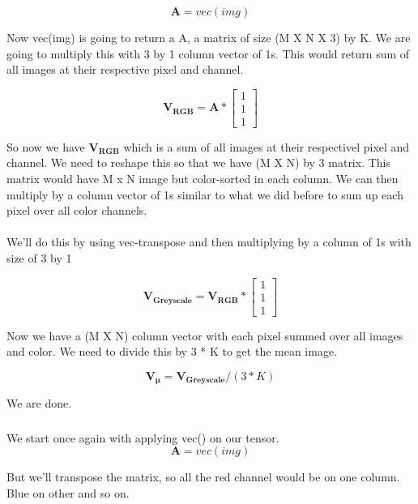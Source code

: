 \documentclass{article}
\newcommand{\matr}[1]{\mathbf{#1}}
\begin{document}
		\begin{equation*}
		\matr{A} = vec(img)
		\end{equation*}

		Now vec(img) is going to return a A, a matrix of size (M X N X 3) by K. We are going to multiply this with 3 by 1 column vector of 1s. 
		This would return sum of all images at their respective pixel and channel.

		\begin{equation*}
		\matr{V_{RGB}} = \matr{A} * 
						\begin{bmatrix} 
						1 \\ 1 \\ 1  
						\end{bmatrix} 
		\end{equation*}	
		
		So now we have $\matr{V_{RGB}}$ which is a sum of all images at their respectivel pixel and channel. We need to reshape this so that
		we have (M X N) by 3 matrix. This matrix would have M x N image but color-sorted in each column.  
		We can then multiply by a column vector of 1s similar to what we did before to sum up each pixel over all color channels. \\
		\\
		We'll do this by using vec-transpose and then multiplying by a column of 1s with size of 3 by 1

		\begin{equation*}
		\matr{V_{Greyscale}} = \matr{V_{RGB}} * 
						\begin{bmatrix} 
						1 \\ 1 \\ 1  
						\end{bmatrix} 
		\end{equation*}	

		Now we have a (M X N) column vector with each pixel summed over all images and color. We need to divide this by 3 * K to get the mean
		image.

		\begin{equation*}
		\matr{V_{\mu}} = \matr{V_{Greyscale}} / (3*K) 
		\end{equation*}	

		We are done.

		\subsubsection{} %
	
		We start once again with applying vec() on our tensor.\\

		\begin{equation*}
		\matr{A} = vec(img)
		\end{equation*}
		
		But we'll transpose the matrix, so all the red channel would be on one column. Blue on other and so on. 
		
				
		
\end{document}
